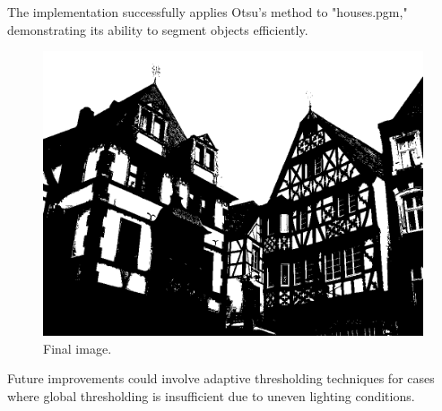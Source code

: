 The implementation successfully applies Otsu’s method to "houses.pgm," demonstrating its ability to segment objects efficiently.
\begin{figure}[H]
    \centering
    \includegraphics[width=0.65\linewidth]{Assignment4/Images/binary_image.png}
    \caption{Final image.}
    \label{fig:enter-label}
\end{figure}
Future improvements could involve adaptive thresholding techniques for cases where global thresholding is insufficient due to uneven lighting conditions.
